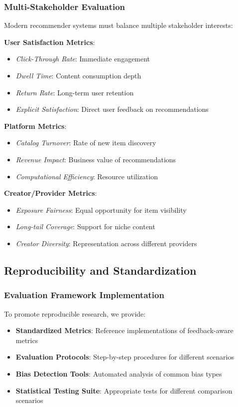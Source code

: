 \subsubsection{Multi-Stakeholder Evaluation}
Modern recommender systems must balance multiple stakeholder interests:

\textbf{User Satisfaction Metrics}:
\begin{itemize}
    \item \textit{Click-Through Rate}: Immediate engagement
    \item \textit{Dwell Time}: Content consumption depth
    \item \textit{Return Rate}: Long-term user retention
    \item \textit{Explicit Satisfaction}: Direct user feedback on recommendations
\end{itemize}

\textbf{Platform Metrics}:
\begin{itemize}
    \item \textit{Catalog Turnover}: Rate of new item discovery
    \item \textit{Revenue Impact}: Business value of recommendations
    \item \textit{Computational Efficiency}: Resource utilization
\end{itemize}

\textbf{Creator/Provider Metrics}:
\begin{itemize}
    \item \textit{Exposure Fairness}: Equal opportunity for item visibility
    \item \textit{Long-tail Coverage}: Support for niche content
    \item \textit{Creator Diversity}: Representation across different providers
\end{itemize}

\subsection{Reproducibility and Standardization}

\subsubsection{Evaluation Framework Implementation}
To promote reproducible research, we provide:

\begin{itemize}
    \item \textbf{Standardized Metrics}: Reference implementations of feedback-aware metrics
    \item \textbf{Evaluation Protocols}: Step-by-step procedures for different scenarios
    \item \textbf{Bias Detection Tools}: Automated analysis of common bias types
    \item \textbf{Statistical Testing Suite}: Appropriate tests for different comparison scenarios
\end{itemize}

